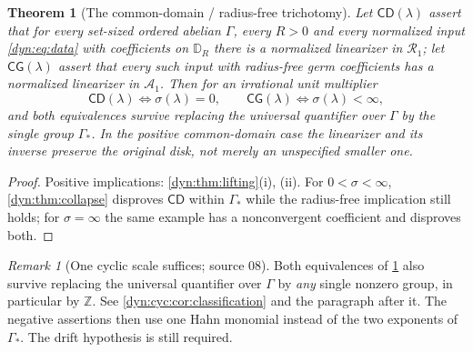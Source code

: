 \documentclass[11pt,letterpaper]{article}
\newtheorem{theorem}{Theorem}[section]
\theoremstyle{definition}
\theoremstyle{remark}
\newtheorem{remark}[remark]{Remark}
\newcommand{\Z}{\mathbb Z}
\numberwithin{equation}{section}
\begin{document}
\begin{theorem}[The common-domain / radius-free trichotomy]
\label{dyn:thm:trichotomy}
Let $\mathsf{CD}(\lambda)$ assert that for every set-sized ordered abelian
$\Gamma$, every $R>0$ and every normalized input \eqref{dyn:eq:data} with
coefficients on $\mathbb D_R$ there is a normalized linearizer in
$\mathcal R_1$; let $\mathsf{CG}(\lambda)$ assert that every such input
with radius-free germ coefficients has a normalized linearizer in
$\mathcal A_1$. Then for an irrational unit multiplier
\begin{equation}\label{dyn:eq:equiv}
 \mathsf{CD}(\lambda)\iff\sigma(\lambda)=0,
 \qquad
 \mathsf{CG}(\lambda)\iff\sigma(\lambda)<\infty,
\end{equation}
and both equivalences survive replacing the universal quantifier over
$\Gamma$ by the single group $\Gamma_{*}$. In the positive common-domain
case the linearizer and its inverse preserve the \emph{original} disk, not
merely an unspecified smaller one.
\end{theorem}
\begin{proof}
Positive implications: \cref{dyn:thm:lifting}(i), (ii). For
$0<\sigma<\infty$, \cref{dyn:thm:collapse} disproves $\mathsf{CD}$ within
$\Gamma_{*}$ while the radius-free implication still holds; for
$\sigma=\infty$ the same example has a nonconvergent coefficient and
disproves both.
\end{proof}

\begin{remark}[One cyclic scale suffices; source 08]
\label{dyn:cyc:rem:trichotomyZ}
Both equivalences of \cref{dyn:thm:trichotomy} also survive replacing the
universal quantifier over $\Gamma$ by \emph{any} single nonzero group, in
particular by $\Z$. See \cref{dyn:cyc:cor:classification} and the paragraph
after it. The negative assertions then use one Hahn monomial instead of the
two exponents of $\Gamma_{*}$. The drift hypothesis is still required.
\end{remark}
\end{document}
